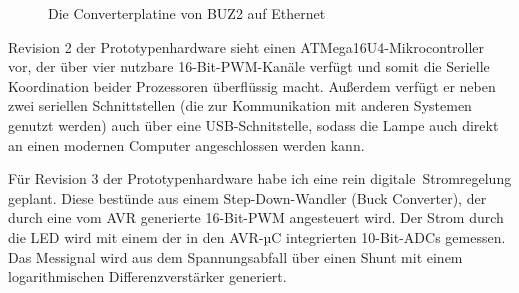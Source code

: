 \documentclass[12pt,a4paper,notitlepage]{article}
\begin{document}
\begin{figure}
\centering
{}
\label{buz2_converter_ethernet}
\caption{Die Converterplatine von BUZ2 auf Ethernet}
\end{figure}

Revision 2 der Prototypenhardware sieht einen ATMega16U4-Mikrocontroller vor, der über vier nutzbare 16-Bit-PWM-Kanäle verfügt und somit die Serielle Koordination beider Prozessoren überflüssig macht. Außerdem verfügt er neben zwei seriellen Schnittstellen (die zur Kommunikation mit anderen Systemen genutzt werden) auch über eine USB-Schnitstelle, sodass die Lampe auch direkt an einen modernen Computer angeschlossen werden kann.

Für Revision 3 der Prototypenhardware habe ich eine rein \glqq digitale\grqq\ Stromregelung geplant. Diese bestünde aus einem Step-Down-Wandler (Buck Converter),%
der durch eine vom AVR generierte 16-Bit-PWM angesteuert wird. Der Strom durch die LED wird mit einem der in den AVR-µC integrierten 10-Bit-ADCs gemessen. Das Messignal wird aus dem Spannungsabfall über einen Shunt%
mit einem logarithmischen Differenzverstärker generiert.
\end{document}
